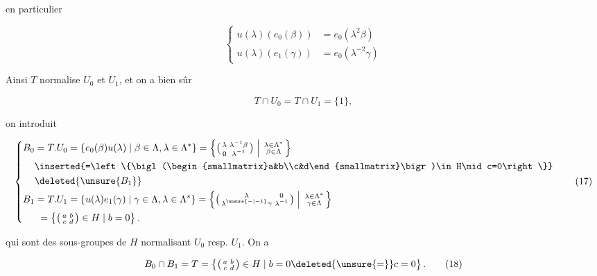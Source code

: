 en particulier

\[
\left\{\begin{aligned}
 u(\lambda)(e_0(\beta))&=e_0(\lambda^2\beta)\\
 u(\lambda)(e_1(\gamma))&=e_0(\lambda^{-2}\gamma)
\end{aligned}\right.\tag*{(15)}
\]


Ainsi $T$ normalise $U_0$ et $U_1$, et on a bien sûr

\[
T\cap U_0=T\cap U_1=\{1\},\tag*{(16)}
\]

on introduit

\[
\left\{\begin{aligned}
 B_0&=T.U_0=\{e_0(\beta)u(\lambda)\mid\beta\in\Lambda,\lambda\in\Lambda^*\}
 =\left\{\bigl(\begin{smallmatrix}\lambda&\lambda^{-1}\beta\\0&\lambda^{-1}\end{smallmatrix}\bigr)\;\middle|\;\begin{smallmatrix}\lambda\in\Lambda^*\\\beta\in\Lambda\end{smallmatrix}\right\}\\
 &\inserted{=\left\{\bigl(\begin{smallmatrix}a&b\\c&d\end{smallmatrix}\bigr)\in H\mid c=0\right\}}\\
 &\deleted{\unsure{B_1}}\\
 B_1&=T.U_1=\{u(\lambda)e_1(\gamma)\mid\gamma\in\Lambda,\lambda\in\Lambda^*\}
 =\left\{\bigl(\begin{smallmatrix}\lambda&0\\\lambda^{\unsure{-|-1}}\gamma&\lambda^{-1}\end{smallmatrix}\bigr)\;\middle|\;\begin{smallmatrix}\lambda\in\Lambda^*\\\gamma\in\Lambda\end{smallmatrix}\right\}\\
 &\ =\left\{\bigl(\begin{smallmatrix}a&b\\c&d\end{smallmatrix}\bigr)\in H\mid b=0\right\}.
\end{aligned}\right.\tag*{(17)}
\]

qui sont des sous-groupes de $H$ normalisant $U_0$ resp. $U_1$. On a

\[
B_0\cap B_1=T=\left\{\bigl(\begin{smallmatrix}a&b\\c&d\end{smallmatrix}\bigr)\in H\mid b=0\deleted{\unsure{=}}c=0\right\}.\tag*{(18)}
\]

